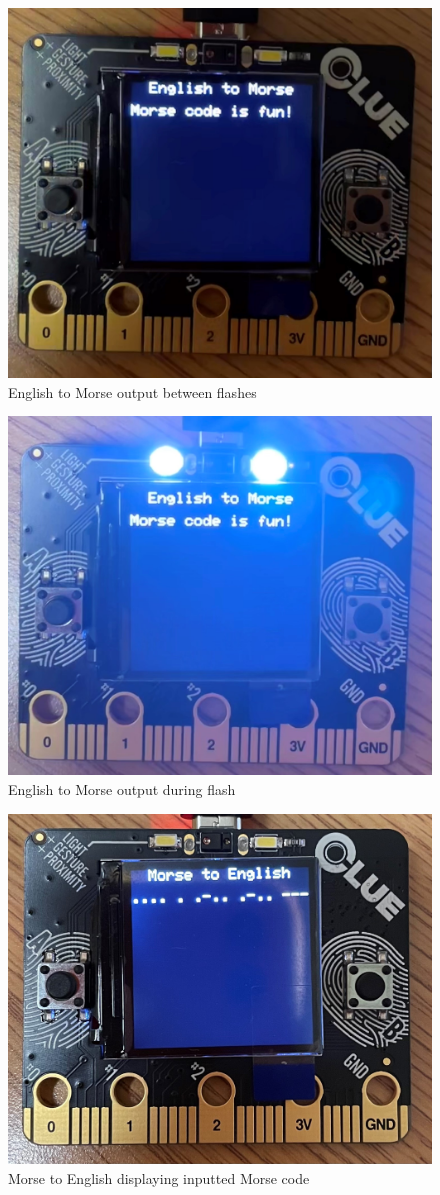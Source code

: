 \documentclass[12pt]{article}
\begin{document}
\begin{figure}[!t]
\centering
\includegraphics[width=4 in]{EtoMaction.jpg}
\caption{English to Morse output between flashes}
\label{fig:EtoMblank}
\end{figure}

\begin{figure}[!t]
\centering
\includegraphics[width=4 in]{images/EtoMactionflash.jpg}
\caption{English to Morse output during flash}
\label{fig:EtoMflash}
\end{figure}

\begin{figure}[!t]
\centering
\includegraphics[width=4 in]{MtoEM.jpg}
\caption{Morse to English displaying inputted Morse code}
\label{fig:MtoEM}
\end{figure}
\end{document}
